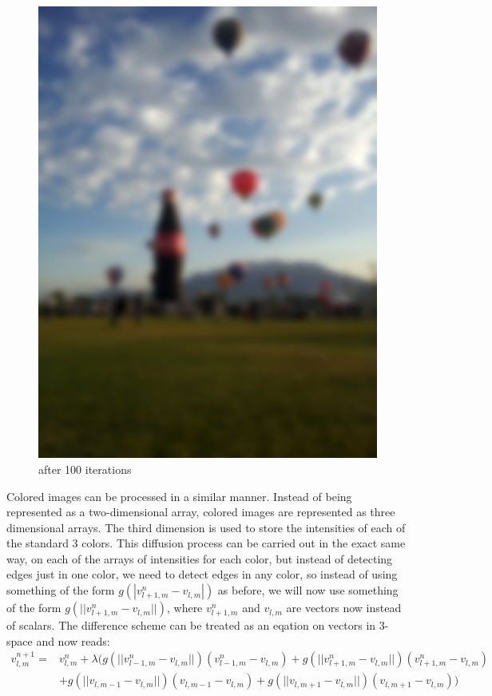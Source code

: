 \begin{figure}[ht]
\begin{minipage}[b]{0.45\linewidth}
\includegraphics[width=\textwidth]{baloon_resized_color_100.jpg}
\caption*{after 100 iterations}
\end{minipage}
\end{figure}
\vfill
\clearpage

Colored images can be processed in a similar manner.
Instead of being represented as a two-dimensional array, colored images are represented as three dimensional arrays.
The third dimension is used to store the intensities of each of the standard 3 colors.
This diffusion process can be carried out in the exact same way, on each of the arrays of intensities for each color, but instead of detecting edges just in one color, we need to detect edges in any color, so instead of using something of the form $g(|v_{l+1,m}^n - v_{l,m}|)$ as before, we will now use something of the form $g(||v_{l+1,m}^n - v_{l,m}||)$, where $v_{l+1,m}^n$ and $v_{l,m}$ are vectors now instead of scalars.
The difference scheme can be treated as an eqation on vectors in 3-space and now reads:
\begin{equation*}
\begin{split}
v_{l,m}^{n+1} =& v_{l,m}^n + \lambda (g(||v_{l-1,m}^n - v_{l,m}||)(v_{l-1,m}^n - v_{l,m}) + g(||v_{l+1,m}^n - v_{l,m}||)(v_{l+1,m}^n - v_{l,m}) \\
 &+ g(||v_{l,m-1} - v_{l,m}||)(v_{l,m-1} - v_{l,m}) + g(||v_{l,m+1} - v_{l,m}||)(v_{l,m+1} - v_{l,m}))
\end{split}
\end{equation*}

